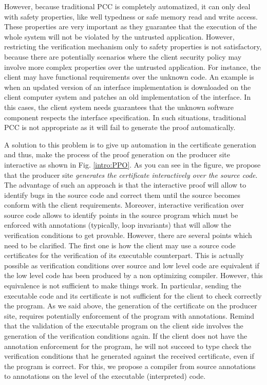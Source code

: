 However, because traditional PCC is completely automatized, it can only deal with safety properties, like well typedness or safe memory read and write access.
These properties are very important as they guarantee that the execution of the whole system will not be violated by the untrusted application.
However, restricting the verification mechanism only to safety properties is not satisfactory, because there are 
potentially scenarios where the client security policy may involve more complex properties over the untrusted application.
For instance, the client may have functional requirements over the unknown code. An example is  when an updated version  of an interface   implementation
 is downloaded on the  client computer system and patches an old implementation of the interface. In this cases, the client system needs guarantees
 that the unknown software component respects the interface specification.
In such situations, traditional PCC is not appropriate as it will fail to generate the proof automatically. 


A solution to this problem is to give up automation in the certificate generation and thus, make the process of  the proof generation 
on the producer site interactive as shown in Fig. \ref{intro:PPO}. As you can see in the figure, we propose that  the producer site
 \textit{generates the certificate interactively over the source code}. The advantage of 
such an approach  is that the interactive proof will allow to identify bugs in the source code and
 correct them until the source becomes conform with the client  requirements. 
Moreover,  interactive verification over source code allows to identify  points in the source program which 
must be enforced with  annotations (typically, loop invariants)
 that will allow the verification conditions to get provable. 
However, there are several points which need to be clarified.
The first one is how the client may use a source code certificates for the verification of its executable counterpart.
This is actually possible as verification conditions over source and low level code are equivalent if the low level 
code has been produced by a non optimizing compiler. However, this equivalence is not sufficient to make things work.
In particular, sending the executable code and its certificate is not sufficient for the client to check correctly the program.
 As we said above, the generation of the certificate on the producer site, requires potentially enforcement of
 the program with annotations. 
 Remind that the validation of the executable program on the client side  involves the generation of the verification
 conditions again. If the client does not have the annotation enforcement for the program, he will not succeed to type
check the verification conditions that he generated against the received certificate, even if the program is correct. 
For this, we propose a compiler from source annotations to annotations on the level of the executable (interpreted) code.



